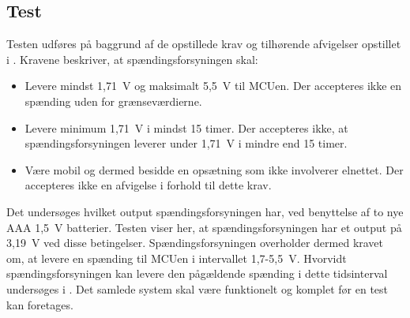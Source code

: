 \subsection{Test} 
Testen udføres på baggrund af de opstillede krav og tilhørende afvigelser opstillet i . Kravene beskriver, at spændingsforsyningen skal:
\begin{itemize}
	\item Levere mindst 1,71~V og maksimalt 5,5~V til MCUen. Der accepteres ikke en spænding uden for grænseværdierne.
	\item Levere minimum 1,71~V i mindst 15 timer. Der accepteres ikke, at spændingsforsyningen leverer under 1,71~V i mindre end 15 timer.
	\item Være mobil og dermed besidde en opsætning som ikke involverer elnettet. Der accepteres ikke en afvigelse i forhold til dette krav.
\end{itemize}
Det undersøges hvilket output spændingsforsyningen har, ved benyttelse af to nye AAA 1,5~V batterier. Testen viser her, at spændingsforsyningen har et output på 3,19~V ved disse betingelser.\newline
Spændingsforsyningen overholder dermed kravet om, at levere en spænding til MCUen i intervallet 1,7-5,5~V. Hvorvidt spændingsforsyningen kan levere den pågældende spænding i dette tidsinterval undersøges i . Det samlede system skal være funktionelt og komplet før en test kan foretages.